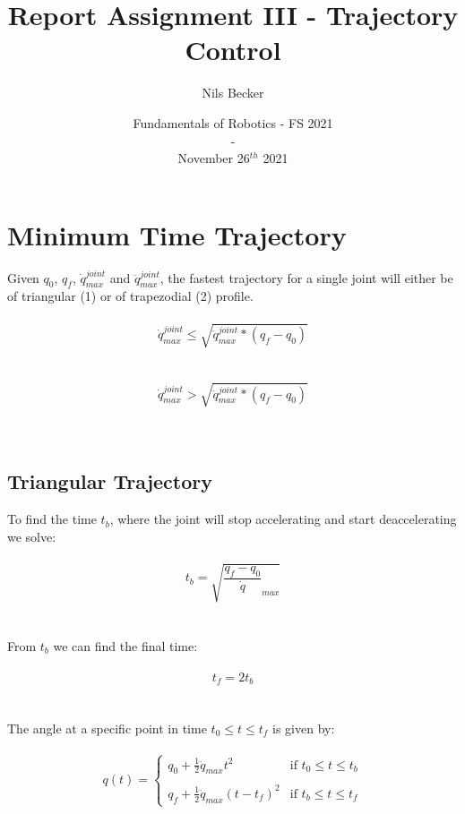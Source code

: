\documentclass{article}
\title{Report Assignment III - Trajectory Control}
\date{Fundamentals of Robotics - FS 2021\\-\\November 26$^{th}$ 2021}
\author{Nils Becker}
\begin{document}
  \maketitle
  \newpage
  \section{Minimum Time Trajectory}
	Given $q_{0}$, $q_{f}$, $\dot{q}_{max}^{joint}$ and $\ddot{q}_{max}^{joint}$, the fastest trajectory for a single joint will either be of triangular (1) or of trapezodial (2) profile. \\
	\\
	\begin{equation}
	\dot{q}_{max}^{joint} \leq \sqrt{\ddot{q}_{max}^{joint} * (q_{f} - q_{0})}
	\end{equation}\\\\
	\begin{equation}
	\dot{q}_{max}^{joint} > \sqrt{\ddot{q}_{max}^{joint} * (q_{f} - q_{0})}
	\end{equation}\\\\
	
	\subsection{Triangular Trajectory}
	
	To find the time $t_{b}$, where the joint will stop accelerating and start deaccelerating we solve:\\\\
	\begin{equation}
	t_{b} = \sqrt{\frac{q_{f} - q_{0}}{\dot{q}}_{max}}
	\end{equation}\\\\
	From $t_{b}$ we can find the final time:\\\\
	\begin{equation}
	t_{f} = 2 t_b
	\end{equation} \\\\
	The angle at a specific point in time $t_{0}\leq t \leq t_{f}$ is given by:\\\\
	\begin{equation}
	q(t) =
\left\{
	\begin{array}{ll}
		q_{0}+\frac{1}{2}\ddot{q}_{max}t^{2}  & \mbox{if } t_{0}\leq t \leq t_{b} \\\\
		q_{f}+\frac{1}{2}\ddot{q}_{max}(t-t_{f})^{2} & \mbox{if }t_{b}\leq t \leq t_{f}
	\end{array}
\right.
	\end{equation}
	\newpage
\end{document}
